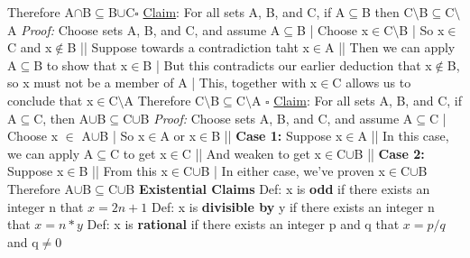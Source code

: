 \documentclass{article}
\begin{document}
Therefore A$\cap$B$\subseteq$B$\cup$C$\square$\newline\newline
\underline{Claim}: For all sets A, B, and C, if A$\subseteq$B then C$\setminus$B$\subseteq$C$\setminus$A\newline
\textit{Proof: } Choose sets A, B, and C, and assume A$\subseteq$B\newline
|	Choose x$\in$C$\setminus$B\newline
|	So x$\in$C and x$\notin$B\newline
||		Suppose towards a contradiction taht x$\in$A\newline
||		Then we can apply A$\subseteq$B to show that x$\in$B\newline
|	But this contradicts our earlier deduction that x$\notin$B, so x must not be a member of A\newline
|	This, together with x$\in$C allows us to conclude that x$\in$C$\setminus$A\newline
Therefore C$\setminus$B$\subseteq$C$\setminus$A $\square$\newline\newline
\underline{Claim}: For all sets A, B, and C, if A$\subseteq$C, then A$\cup$B$\subseteq$C$\cup$B\newline
\textit{Proof: } Choose sets A, B, and C, and assume A$\subseteq$C\newline
|	Choose x $\in$ A$\cup$B\newline
|	So x$\in$A or x$\in$B\newline
||		\textbf{Case 1:} Suppose x$\in$A\newline
||		In this case, we can apply A$\subseteq$C to get x$\in$C\newline
||		And weaken to get x$\in$C$\cup$B\newline
||		\textbf{Case 2:} Suppose x$\in$B\newline
||		From this x$\in$C$\cup$B\newline
|	In either case, we've proven x$\in$C$\cup$B\newline
Therefore A$\cup$B$\subseteq$C$\cup$B\newline\newline
\textbf{Existential Claims}\newline
Def: x is \textbf{odd} if there exists an integer n that ${x = 2n + 1}$\newline
Def: x is \textbf{divisible by} y if there exists an integer n that ${x = n*y}$\newline
Def: x is \textbf{rational} if there exists an integer p and q that ${x = p/q}$ and q$\neq$0\newline\newline
\end{document}
